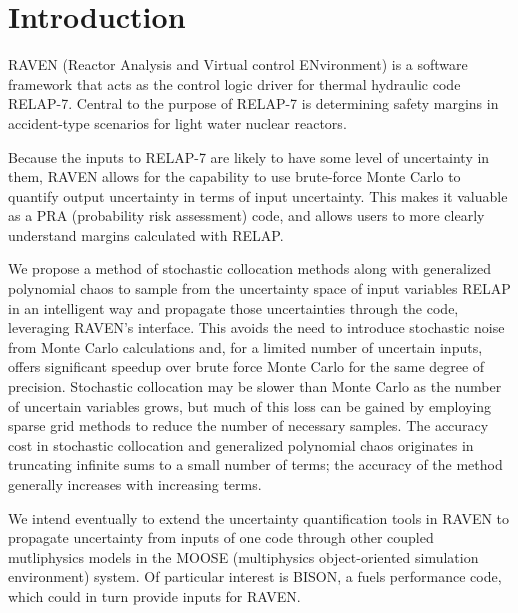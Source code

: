 \section{Introduction}
RAVEN (Reactor Analysis and Virtual control ENvironment) is a software framework that acts as the control logic driver for thermal hydraulic code RELAP-7.  Central to the purpose of RELAP-7 is determining safety margins in accident-type scenarios for light water nuclear reactors.  

Because the inputs to RELAP-7 are likely to have some level of uncertainty in them, RAVEN allows for the capability to use brute-force Monte Carlo to quantify output uncertainty in terms of input uncertainty.  This makes it valuable as a PRA (probability risk assessment) code, and allows users to more clearly understand margins calculated with RELAP.  

We propose a method of stochastic collocation methods along with generalized polynomial chaos to sample from the uncertainty space of input variables RELAP in an intelligent way and propagate those uncertainties through the code, leveraging RAVEN's interface.  This avoids the need to introduce stochastic noise from Monte Carlo calculations and, for a limited number of uncertain inputs, offers significant speedup over brute force Monte Carlo for the same degree of precision.  Stochastic collocation may be slower than Monte Carlo as the number of uncertain variables grows, but much of this loss can be gained by employing sparse grid methods to reduce the number of necessary samples.  The accuracy cost in stochastic collocation and generalized polynomial chaos originates in truncating infinite sums to a small number of terms; the accuracy of the method generally increases with increasing terms.

We intend eventually to extend the uncertainty quantification tools in RAVEN to propagate uncertainty from inputs of one code through other coupled mutliphysics models in the MOOSE (multiphysics object-oriented simulation environment) system.  Of particular interest is BISON, a fuels performance code, which could in turn provide inputs for RAVEN.